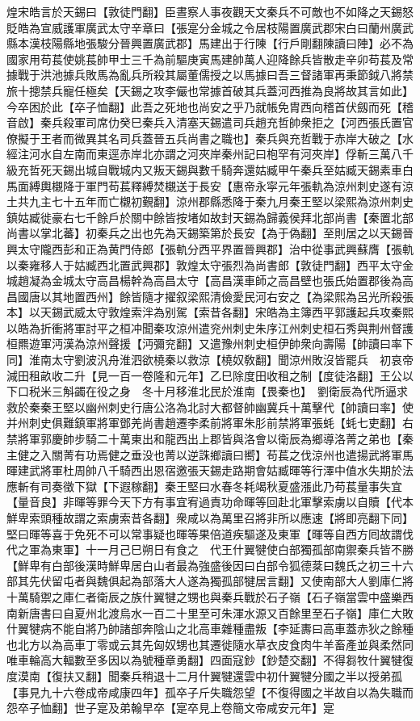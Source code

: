 煌宋皓言於天錫曰【敦徒門翻】臣晝察人事夜觀天文秦兵不可敵也不如降之天錫怒貶皓為宣威護軍廣武太守辛章曰【張寔分金城之令居枝陽置廣武郡宋白曰蘭州廣武縣本漢枝陽縣地張駿分晉興置廣武郡】馬建出于行陳【行戶剛翻陳讀曰陣】必不為國家用苟萇使姚萇帥甲士三千為前驅庚寅馬建帥萬人迎降餘兵皆散走辛卯苟萇及常據戰于洪池據兵敗馬為亂兵所殺其屬董儒授之以馬據曰吾三督諸軍再秉節鉞八將禁旅十摠禁兵寵任極矣【天錫之攻李儼也常據首破其兵蓋河西推為良將故其言如此】今卒困於此【卒子恤翻】此吾之死地也尚安之乎乃就帳免胄西向稽首伏劔而死【稽音啟】秦兵殺軍司席仂癸巳秦兵入清塞天錫遣司兵趙充哲帥衆拒之【河西張氏置官僚擬于王者而微異其名司兵蓋晉五兵尚書之職也】秦兵與充哲戰于赤岸大破之【水經注河水自左南而東逕赤岸北亦謂之河夾岸秦州記曰枹罕有河夾岸】俘斬三萬八千級充哲死天錫出城自戰城内又叛天錫與數千騎奔還姑臧甲午秦兵至姑臧天錫素車白馬面縛輿櫬降于軍門苟萇釋縛焚櫬送于長安【惠帝永寜元年張軌為涼州刺史遂有涼土共九主七十五年而亡櫬初覲翻】涼州郡縣悉降于秦九月秦王堅以梁熙為涼州刺史鎮姑臧徙豪右七千餘戶於關中餘皆按堵如故封天錫為歸義侯拜北部尚書【秦置北部尚書以掌北蕃】初秦兵之出也先為天錫築第於長安【為于偽翻】至則居之以天錫晉興太守隴西彭和正為黄門侍郎【張軌分西平界置晉興郡】治中從事武興蘇膺【張軌以秦雍移人于姑臧西北置武興郡】敦煌太守張烈為尚書郎【敦徒門翻】西平太守金城趙凝為金城太守高昌楊幹為高昌太守【高昌漢車師之高昌壁也張氏始置郡後為高昌國唐以其地置西州】餘皆隨才擢叙梁熙清儉愛民河右安之【為梁熙為呂光所殺張本】以天錫武威太守敦煌索泮為别駕【索昔各翻】宋皓為主簿西平郭護起兵攻秦熙以皓為折衝將軍討平之桓冲聞秦攻涼州遣兖州刺史朱序江州刺史桓石秀與荆州督護桓羆遊軍沔漢為涼州聲援【沔彌兖翻】又遣豫州刺史桓伊帥衆向壽陽【帥讀曰率下同】淮南太守劉波汎舟淮泗欲橈秦以救涼【橈奴敎翻】聞涼州敗沒皆罷兵　初哀帝減田租畝收二升【見一百一卷隆和元年】乙巳除度田收租之制【度徒洛翻】王公以下口税米三斛蠲在役之身　冬十月移淮北民於淮南【畏秦也】　劉衛辰為代所逼求救於秦秦王堅以幽州刺史行唐公洛為北討大都督帥幽冀兵十萬擊代【帥讀曰率】使并州刺史俱難鎮軍將軍鄧羌尚書趙遷李柔前將軍朱肜前禁將軍張蚝【蚝七吏翻】右禁將軍郭慶帥步騎二十萬東出和龍西出上郡皆與洛會以衛辰為鄉導洛菁之弟也【秦主健之入關菁有功焉健之垂没也菁以逆誅鄉讀曰嚮】苟萇之伐涼州也遣揚武將軍馬暉建武將軍杜周帥八千騎西出恩宿邀張天錫走路期會姑臧暉等行澤中值水失期於法應斬有司奏徵下獄【下遐稼翻】秦王堅曰水春冬耗竭秋夏盛漲此乃苟萇量事失宜【量音良】非暉等罪今天下方有事宜宥過責功命暉等回赴北軍擊索虜以自贖【代本鮮卑索頭種故謂之索虜索昔各翻】衆咸以為萬里召將非所以應速【將即亮翻下同】堅曰暉等喜于免死不可以常事疑也暉等果倍道疾驅遂及東軍【暉等自西方囘故謂伐代之軍為東軍】十一月己巳朔日有食之　代王什翼犍使白部獨孤部南禦秦兵皆不勝【鮮卑有白部後漢時鮮卑居白山者最為強盛後因曰白部令狐德棻曰魏氏之初三十六部其先伏留屯者與魏俱起為部落大人遂為獨孤部犍居言翻】又使南部大人劉庫仁將十萬騎禦之庫仁者衛辰之族什翼犍之甥也與秦兵戰於石子嶺【石子嶺當雲中盛樂西南新唐書曰自夏州北渡烏水一百二十里至可朱渾水源又百餘里至石子嶺】庫仁大敗什翼犍病不能自將乃帥諸部奔陰山之北高車雜種盡叛【李延夀曰高車蓋赤狄之餘種也北方以為高車丁零或云其先匈奴甥也其遷徙隨水草衣皮食肉牛羊畜產並與柔然同唯車輪高大輻數至多因以為號種章勇翻】四面寇鈔【鈔楚交翻】不得芻牧什翼犍復度漠南【復扶又翻】聞秦兵稍退十二月什翼犍還雲中初什翼犍分國之半以授弟孤【事見九十六卷成帝咸康四年】孤卒子斤失職怨望【不復得國之半故自以為失職而怨卒子恤翻】世子寔及弟翰早卒【寔卒見上卷簡文帝咸安元年】寔